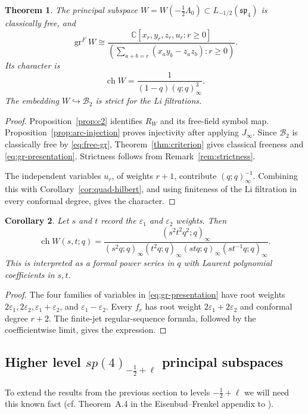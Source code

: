 \documentclass[11pt]{amsart}
\newtheorem{theorem}{Theorem}[section]
\newtheorem{corollary}[theorem]{Corollary}
\theoremstyle{definition}
\theoremstyle{remark}
\newcommand{\C}{\mathbb C}
\newcommand{\J}{J_\infty}
\newcommand{\spalg}{\mathfrak{sp}}
\DeclareMathOperator{\gr}{gr}
\DeclareMathOperator{\ch}{ch}
\newcommand{\B}{\mathcal B}
\begin{document}
\begin{theorem}\label{thm:main}
The principal subspace $W=W(-\frac12\Lambda_0)\subset L_{-1/2}(\spalg_4)$ is
classically free, and
\begin{equation}\label{eq:gr-presentation}
 \gr^F W\cong
 \frac{\C[x_r,y_r,z_r,u_r:r\geq0]}
 {\left(\sum_{a+b=r}(x_a y_b-z_a z_b):r\geq0\right)}.
\end{equation}
Its character is
\[
 \ch W=\frac1{(1-q)(q;q)_\infty^3}.
\]
The embedding $W\hookrightarrow\B_2$ is strict for the Li
filtrations.
\end{theorem}
\begin{proof}
Proposition~\ref{prop:c2} identifies $R_{W}$ and its free-field
symbol map. Proposition~\ref{prop:arc-injection} proves injectivity
after applying $\J$. Since $\B_2$ is classically free by
\eqref{eq:free-gr}, Theorem~\ref{thm:criterion} gives classical
freeness and \eqref{eq:gr-presentation}. Strictness follows from
Remark~\ref{rem:strictness}.

The independent variables $u_r$, of weights $r+1$, contribute
$(q;q)_\infty^{-1}$. Combining this with
Corollary~\ref{cor:quad-hilbert}, and using finiteness of the Li
filtration in every conformal degree, gives the character.
\end{proof}

\begin{corollary}\label{cor:multichar}
Let $s$ and $t$ record the $\varepsilon_1$ and $\varepsilon_2$ weights.
Then
\[
 \ch W(s,t;q)=
 \frac{(s^2t^2q^2;q)_\infty}
 {(s^2q;q)_\infty(t^2q;q)_\infty(stq;q)_\infty(st^{-1}q;q)_\infty}.
\]
This is interpreted as a formal power series in $q$ with Laurent
polynomial coefficients in $s,t$.
\end{corollary}
\begin{proof}
The four families of variables in \eqref{eq:gr-presentation} have
root weights $2\varepsilon_1,2\varepsilon_2,\varepsilon_1+\varepsilon_2$,
and $\varepsilon_1-\varepsilon_2$. Every $f_r$ has root weight
$2\varepsilon_1+2\varepsilon_2$ and conformal degree $r+2$.
The finite-jet regular-sequence formula, followed by the
coefficientwise limit, gives the expression.
\end{proof}

\subsection{Higher level $sp(4)_{-\frac12+\ell}$ principal subspaces}

To extend the results from the previous section to levels $-\frac12+\ell$ we will need this known fact (cf. Theorem~A.4 in the
Eisenbud--Frenkel appendix to \cite{Mus}).
\end{document}

